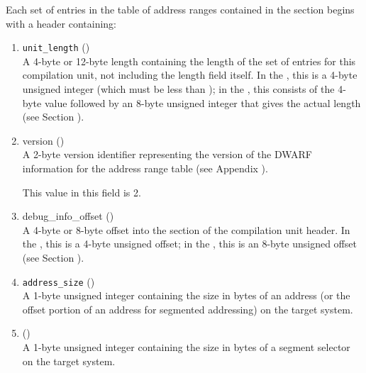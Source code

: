Each set of entries in the table of address ranges contained
in the \dotdebugaranges{}
section begins with a header containing:
\begin{enumerate}[1. ]

\item \texttt{unit\_length} () \\
A 4-byte or 12-byte length containing the length of the
set of entries for this compilation unit, not including the
length field itself. In the \thirtytwobitdwarfformat, this is a
4-byte unsigned integer (which must be less than \xfffffffzero);
in the \sixtyfourbitdwarfformat, this consists of the 4-byte value
\wffffffff followed by an 8-byte unsigned integer that gives
the actual length 
(see Section ).

\item version (\HFTuhalf) \\
A 2-byte version identifier representing the version of the
DWARF information for the address range table
(see Appendix ).

This value in this field  is 2. 
 
\item debug\_info\_offset () \\
A 
4-byte or 8-byte offset into the 
\dotdebuginfo{} section of
the compilation unit header. In the \thirtytwobitdwarfformat,
this is a 4-byte unsigned offset; in the \sixtyfourbitdwarfformat,
this is an 8-byte unsigned offset 
(see Section ).

\item \texttt{address\_size} (\HFTubyte) \\
A 1-byte unsigned integer containing the size in bytes of an
address 
(or the offset portion of an address for segmented
addressing) on the target system.

\item \HFNsegmentselectorsize{} (\HFTubyte) \\
A 1-byte unsigned integer containing the size in bytes of a
segment selector on the target system.

\end{enumerate}

